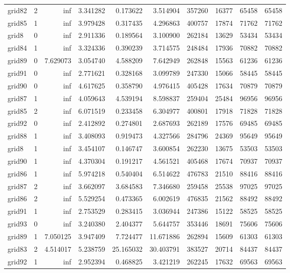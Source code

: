 \begin{longtable}{|l|r|r|r|r|r|r|r|r|r|}
grid82 & 2 & inf & 3.341282 & 0.173622 & 3.514904 & 357260 & 16377 & 65458 & 65458 \\
grid85 & 1 & inf & 3.979428 & 0.317435 & 4.296863 & 400757 & 17874 & 71762 & 71762 \\
grid8 & 0 & inf & 2.911336 & 0.189564 & 3.100900 & 262184 & 13629 & 53434 & 53434 \\
grid84 & 1 & inf & 3.324336 & 0.390239 & 3.714575 & 248484 & 17936 & 70882 & 70882 \\
grid89 & 0 & 7.629073 & 3.054740 & 4.588209 & 7.642949 & 262848 & 15563 & 61236 & 61236 \\
grid91 & 0 & inf & 2.771621 & 0.328168 & 3.099789 & 247330 & 15066 & 58445 & 58445 \\
grid90 & 0 & inf & 4.617625 & 0.358790 & 4.976415 & 405428 & 17634 & 70879 & 70879 \\
grid87 & 1 & inf & 4.059643 & 4.539194 & 8.598837 & 259404 & 25484 & 96956 & 96956 \\
grid85 & 2 & inf & 6.071519 & 0.233458 & 6.304977 & 400801 & 17918 & 71828 & 71828 \\
grid92 & 0 & inf & 2.412892 & 0.274801 & 2.687693 & 262189 & 17576 & 69485 & 69485 \\
grid88 & 1 & inf & 3.408093 & 0.919473 & 4.327566 & 284796 & 24369 & 95649 & 95649 \\
grid8 & 1 & inf & 3.454107 & 0.146747 & 3.600854 & 262230 & 13675 & 53503 & 53503 \\
grid90 & 1 & inf & 4.370304 & 0.191217 & 4.561521 & 405468 & 17674 & 70937 & 70937 \\
grid86 & 1 & inf & 5.974218 & 0.540404 & 6.514622 & 476783 & 21510 & 88416 & 88416 \\
grid87 & 2 & inf & 3.662097 & 3.684583 & 7.346680 & 259458 & 25538 & 97025 & 97025 \\
grid86 & 2 & inf & 5.529254 & 0.473365 & 6.002619 & 476835 & 21562 & 88492 & 88492 \\
grid91 & 1 & inf & 2.753529 & 0.283415 & 3.036944 & 247386 & 15122 & 58525 & 58525 \\
grid93 & 0 & inf & 3.240380 & 2.404377 & 5.644757 & 353446 & 18691 & 75606 & 75606 \\
grid89 & 1 & 7.050125 & 3.947409 & 7.724477 & 11.671886 & 262894 & 15609 & 61303 & 61303 \\
grid83 & 2 & 4.514017 & 5.238759 & 25.165032 & 30.403791 & 383527 & 20714 & 84437 & 84437 \\
grid92 & 1 & inf & 2.952394 & 0.468825 & 3.421219 & 262245 & 17632 & 69563 & 69563 \\

\end{longtable}
